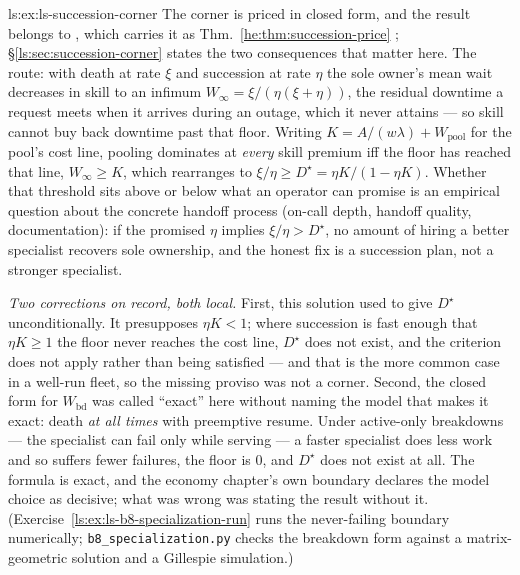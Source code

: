 \begin{pdSolution}{ls:ex:ls-succession-corner}
The corner is priced in closed form, and the result belongs to
%
\ifpdbook
, which carries it as Thm.~\ref{he:thm:succession-price}%
\fi
; \S\ref{ls:sec:succession-corner} states the two consequences that matter here.
The route: with death at rate $\xi$ and succession at rate $\eta$ the sole
owner's mean wait decreases in skill to an infimum
$W_\infty=\xi/(\eta(\xi+\eta))$, the residual downtime a request meets when it
arrives during an outage, which it never attains --- so skill cannot buy back
downtime past that floor. Writing $K=A/(w\lambda)+W_{\mathrm{pool}}$ for the
pool's cost line, pooling dominates at \emph{every} skill premium iff the floor
has reached that line, $W_\infty\ge K$, which rearranges to
$\xi/\eta\ge D^\star=\eta K/(1-\eta K)$. Whether that threshold sits above or
below what an operator can promise is an empirical question about the concrete
handoff process (on-call depth, handoff quality, documentation): if the
promised $\eta$ implies $\xi/\eta>D^\star$, no amount of hiring a better
specialist recovers sole ownership, and the honest fix is a succession plan,
not a stronger specialist.

\emph{Two corrections on record, both local.} First, this solution used to give
$D^\star$ unconditionally. It presupposes $\eta K<1$; where succession is fast
enough that $\eta K\ge1$ the floor never reaches the cost line, $D^\star$ does
not exist, and the criterion does not apply rather than being satisfied --- and
that is the more common case in a well-run fleet, so the missing proviso was
not a corner. Second, the closed form for $W_{\mathrm{bd}}$ was called
``exact'' here without naming the model that makes it exact: death \emph{at all
times} with preemptive resume. Under active-only breakdowns --- the specialist
can fail only while serving --- a faster specialist does less work and so
suffers fewer failures, the floor is $0$, and $D^\star$ does not exist at all.
The formula is exact, and the economy chapter's own boundary declares the model
choice as decisive; what was wrong was stating the result without it.
(Exercise~\ref{ls:ex:ls-b8-specialization-run} runs the never-failing boundary
numerically; \texttt{b8\_specialization.py} checks the breakdown form against a
matrix-geometric solution and a Gillespie simulation.)
\end{pdSolution}
